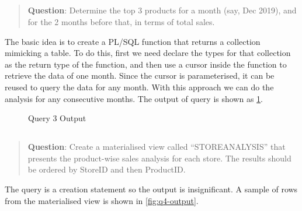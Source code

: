 \documentclass[
  a4paper,
]{article}
\begin{document}
\hypertarget{section-2}{%
\subsection{}\label{section-2}}

\begin{quote}
\textbf{Question}: Determine the top 3 products for a month (say, Dec
2019), and for the 2 months before that, in terms of total sales.
\end{quote}

The basic idea is to create a PL/SQL function that returns a collection
mimicking a table. To do this, first we need declare the types for that
collection as the return type of the function, and then use a cursor
inside the function to retrieve the data of one month. Since the cursor
is parameterised, it can be reused to query the data for any month. With
this approach we can do the analysis for any consecutive months. The
output of query is shown as \cref{fig:q3-output}.

\begin{figure}
    \centering
    \caption{Query 3 Output\label{fig:q3-output}}
\end{figure}

\hypertarget{section-3}{%
\subsection{}\label{section-3}}

\begin{quote}
\textbf{Question}: Create a materialised view called ``STOREANALYSIS''
that presents the product-wise sales analysis for each store. The
results should be ordered by StoreID and then ProductID.
\end{quote}

The query is a creation statement so the output is insignificant. A
sample of rows from the materialised view is shown in
\cref{fig:q4-output}.
\end{document}
